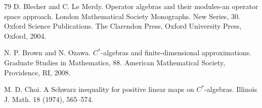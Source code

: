 \documentclass[leqno]{article} %
\numberwithin{equation}{section}
\begin{document}
\begin{thebibliography}{79}
D. Blecher and C. Le Merdy.
\newblock Operator algebras and their modules-an operator space approach.
\newblock London Mathematical Society Monographs. New Series, 30. Oxford Science Publications. The Clarendon Press, Oxford University Press, Oxford, 2004.


N. P. Brown and N. Ozawa.
\newblock $C^*$-algebras and finite-dimensional approximations.
\newblock Graduate Studies in Mathematics, 88. American Mathematical Society, Providence, RI, 2008.









M. D. Choi.
\newblock A Schwarz inequality for positive linear maps on $C^*$-algebras.
\newblock Illinois J. Math. 18 (1974), 565--574.


\end{thebibliography}
\end{document}
